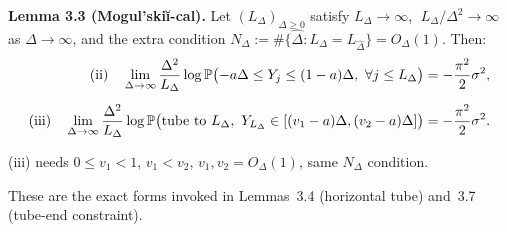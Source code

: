 \small
\textbf{Lemma 3.3 (Mogul'ski\u{i}-cal).}
Let $(L_\Delta)_{\Delta\ge0}$ satisfy
$L_\Delta\to\infty$, $\;L_\Delta/\Delta^2\to\infty$ as $\Delta\to\infty$,
and the extra condition
$N_\Delta:=\#\{\hat\Delta:L_\Delta=L_{\hat\Delta}\}=O_\Delta(1)$. Then:
\begin{align*}
    \text{(ii)}\quad
    \lim_{\Delta\to\infty}\frac{\Delta^2}{L_\Delta}
    \log\P\bigl(-a\Delta\le Y_j\le(1-a)\Delta,\ \forall j\le L_\Delta\bigr)
    &=-\frac{\pi^2}{2}\sigma^2,\\[2mm]
    \text{(iii)}\quad
    \lim_{\Delta\to\infty}\frac{\Delta^2}{L_\Delta}
    \log\P\bigl(\text{tube to }L_\Delta,\ Y_{L_\Delta}\in[(v_1-a)\Delta,(v_2-a)\Delta]\bigr)
    &=-\frac{\pi^2}{2}\sigma^2.
\end{align*}
\par\smallskip
{\footnotesize (iii) needs $0\le v_1<1$, $v_1<v_2$, $v_1,v_2=O_\Delta(1)$, same $N_\Delta$ condition.}

\medskip
These are the exact forms invoked in Lemmas~3.4 (horizontal tube) and~3.7 (tube-end constraint).
